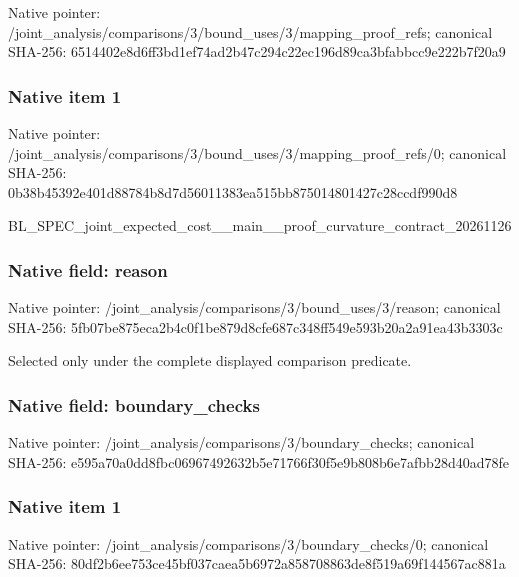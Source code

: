 \documentclass[10pt,a4paper]{article}
\begin{document}
Native pointer: /joint\_analysis/comparis\allowbreak{}ons/3/bound\_uses/3/mappi\allowbreak{}ng\_proof\_refs; canonical SHA-256: 6514402e8d6ff3bd1ef74ad2\allowbreak{}b47c294c22ec196d89ca3bfa\allowbreak{}bbcc9e222b7f20a9



\subsubsection{Native item 1}


Native pointer: /joint\_analysis/comparis\allowbreak{}ons/3/bound\_uses/3/mappi\allowbreak{}ng\_proof\_refs/0; canonical SHA-256: 0b38b45392e401d88784b8d7\allowbreak{}d56011383ea515bb87501480\allowbreak{}1427c28ccdf990d8


BL\_SPEC\_joint\_expected\_c\allowbreak{}ost\_\_main\_\_proof\_curvatu\allowbreak{}re\_contract\_20261126


\subsubsection{Native field: reason}


Native pointer: /joint\_analysis/comparis\allowbreak{}ons/3/bound\_uses/3/reaso\allowbreak{}n; canonical SHA-256: 5fb07be875eca2b4c0f1be87\allowbreak{}9d8cfe687c348ff549e593b2\allowbreak{}0a2a91ea43b3303c


Selected only under the complete displayed comparison predicate.


\subsubsection{Native field: boundary\_checks}


Native pointer: /joint\_analysis/comparis\allowbreak{}ons/3/boundary\_checks; canonical SHA-256: e595a70a0dd8fbc069674926\allowbreak{}32b5e71766f30f5e9b808b6e\allowbreak{}7afbb28d40ad78fe



\subsubsection{Native item 1}


Native pointer: /joint\_analysis/comparis\allowbreak{}ons/3/boundary\_checks/0; canonical SHA-256: 80df2b6ee753ce45bf037cae\allowbreak{}a5b6972a858708863de8f519\allowbreak{}a69f144567ac881a
\end{document}

